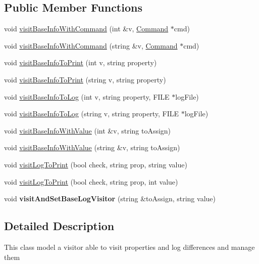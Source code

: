 \subsection*{Public Member Functions}
\begin{DoxyCompactItemize}
\item 
void \hyperlink{classBaseInfoVisitor_a96013581736191e0c186746f061b6d2e}{visit\+Base\+Info\+With\+Command} (int \&v, \hyperlink{classCommand}{Command} $\ast$cmd)
\item 
void \hyperlink{classBaseInfoVisitor_a8615d145a52433f981a147642038fe91}{visit\+Base\+Info\+With\+Command} (string \&v, \hyperlink{classCommand}{Command} $\ast$cmd)
\item 
void \hyperlink{classBaseInfoVisitor_a395234ebebdfbaf4f7e155bfc0a5aa5d}{visit\+Base\+Info\+To\+Print} (int v, string property)
\item 
void \hyperlink{classBaseInfoVisitor_a5be08c690d21e5c1d9257efdf0a75ca4}{visit\+Base\+Info\+To\+Print} (string v, string property)
\item 
void \hyperlink{classBaseInfoVisitor_adf0f9a3ad34d26595ee2cb78cc370a65}{visit\+Base\+Info\+To\+Log} (int v, string property, F\+I\+LE $\ast$log\+File)
\item 
void \hyperlink{classBaseInfoVisitor_a8590d40b5c1c277dee482518ad31c494}{visit\+Base\+Info\+To\+Log} (string v, string property, F\+I\+LE $\ast$log\+File)
\item 
void \hyperlink{classBaseInfoVisitor_a56c3bb5a441e77566e62881e5a82b9d8}{visit\+Base\+Info\+With\+Value} (int \&v, string to\+Assign)
\item 
void \hyperlink{classBaseInfoVisitor_adc07ce4d4919fccad038d90c9c820178}{visit\+Base\+Info\+With\+Value} (string \&v, string to\+Assign)
\item 
void \hyperlink{classBaseInfoVisitor_ad0c9667e9004fd1494f79b09947b0620}{visit\+Log\+To\+Print} (bool check, string prop, string value)
\item 
void \hyperlink{classBaseInfoVisitor_a326f9be710640548f76a08253422318a}{visit\+Log\+To\+Print} (bool check, string prop, int value)
\item 
void {\bfseries visit\+And\+Set\+Base\+Log\+Visitor} (string \&to\+Assign, string value)\hypertarget{classBaseInfoVisitor_a4782e630fd239dca702d5572c483ddf7}{}\label{classBaseInfoVisitor_a4782e630fd239dca702d5572c483ddf7}

\end{DoxyCompactItemize}


\subsection{Detailed Description}
This class model a visitor able to visit properties and log differences and manage them 

